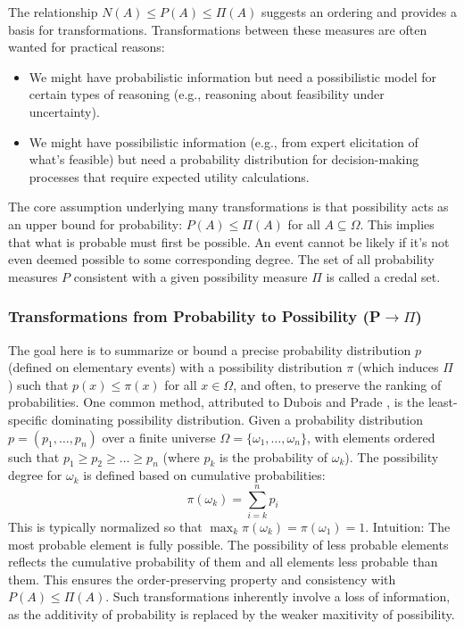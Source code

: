 The relationship $N(A) \le P(A) \le \Pi(A)$  suggests an ordering and provides a basis for transformations. Transformations between these measures are often wanted for practical reasons:
\begin{itemize}
    \item We might have probabilistic information but need a possibilistic model for certain types of reasoning (e.g., reasoning about feasibility under uncertainty).
    \item We might have possibilistic information (e.g., from expert elicitation of what's feasible) but need a probability distribution for decision-making processes that require expected utility calculations.
\end{itemize}
The core assumption underlying many transformations is that possibility acts as an upper bound for probability: $P(A) \le \Pi(A)$ for all $A \subseteq \Omega$. This implies that what is probable must first be possible. An event cannot be likely if it's not even deemed possible to some corresponding degree. The set of all probability measures $P$ consistent with a given possibility measure $\Pi$ is called a credal set.

\subsubsection{Transformations from Probability to Possibility (P$\to\Pi$)}
The goal here is to summarize or bound a precise probability distribution $p$ (defined on elementary events) with a possibility distribution $\pi$ (which induces $\Pi$) such that $p(x) \le \pi(x)$ for all $x \in \Omega$, and often, to preserve the ranking of probabilities.
One common method, attributed to Dubois and Prade \cite{Dubois1997}, is the least-specific dominating possibility distribution.
Given a probability distribution $p=(p_1, \dots, p_n)$ over a finite universe $\Omega = \{\omega_1, \dots, \omega_n\}$, with elements ordered such that $p_1 \ge p_2 \ge \dots \ge p_n$ (where $p_k$ is the probability of $\omega_k$). The possibility degree for $\omega_k$ is defined based on cumulative probabilities:
\[ \pi(\omega_k) = \sum_{i=k}^{n} p_i \]
This is typically normalized so that $\max_k \pi(\omega_k) = \pi(\omega_1) = 1$.
Intuition: The most probable element is fully possible. The possibility of less probable elements reflects the cumulative probability of them and all elements less probable than them. This ensures the order-preserving property and consistency with $P(A) \le \Pi(A)$. Such transformations inherently involve a loss of information, as the additivity of probability is replaced by the weaker maxitivity of possibility.

